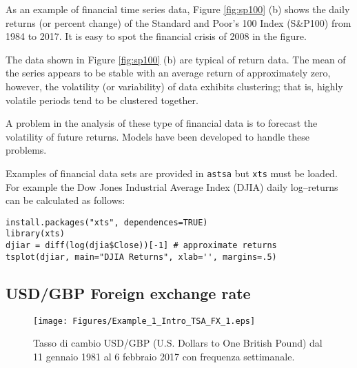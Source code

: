 \documentclass[
paper=128mm:96mm, %
fontsize=9.5pt, %
pagesize, %
parskip=half-, %
]{scrartcl} %
\theoremstyle{mythmstyle} %
\begin{document}
As an example of financial time series data, Figure \ref{fig:sp100} (b) shows the daily returns (or percent change) of the Standard and Poor's 100 Index (S\&P100) from 1984 to 2017. It is easy to spot the financial crisis of 2008 in the figure. 

The data shown in Figure \ref{fig:sp100} (b) are typical of return data. The mean of the series appears to be stable with an average return of approximately zero, however, the volatility (or variability) of data exhibits clustering; that is, highly volatile periods tend to be clustered together. 

A problem in the analysis of these type of financial data is to forecast the volatility of future returns. Models have been developed to handle these problems.
\clearpage

Examples of financial data sets are provided in \texttt{astsa} but \texttt{xts} must be loaded. For example the Dow Jones Industrial Average Index (DJIA) daily log--returns can be calculated as follows:

\begin{lstlisting}[belowskip=-0.8 \baselineskip]
install.packages("xts", dependences=TRUE)
library(xts)
djiar = diff(log(djia$Close))[-1] # approximate returns 
tsplot(djiar, main="DJIA Returns", xlab='', margins=.5)
\end{lstlisting}
\clearpage


%
\subsection{USD/GBP Foreign exchange rate}
\begin{figure}[!h]
\begin{center}
%
\texttt{[image: Figures/Example\_1\_Intro\_TSA\_FX\_1.eps]}
%
\caption{\footnotesize{Tasso di cambio USD/GBP (U.S. Dollars to One British Pound) dal 11 gennaio 1981 al 6 febbraio 2017 con frequenza settimanale. }}
%
\label{fig:usukexchrate_1}
%
\end{center}
\end{figure}
%
\clearpage


%
\end{document}
